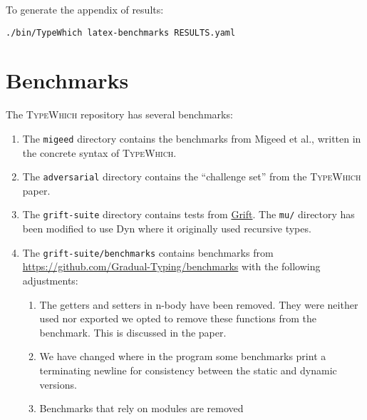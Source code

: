 \documentclass{article}
\newcommand{\system}{\textsc{TypeWhich}\xspace}
\begin{document}
To generate the appendix of results:

\begin{verbatim}
./bin/TypeWhich latex-benchmarks RESULTS.yaml 
\end{verbatim}

\section{Benchmarks}

The \system repository has several benchmarks:

\begin{enumerate}
   
\item The \texttt{migeed} directory contains the benchmarks
from Migeed et al., written in the concrete syntax of \system.

\item The \texttt{adversarial} directory contains the ``challenge set'' from
the \system paper.

\item The \texttt{grift-suite} directory contains tests from
\href{https://github.com/Gradual-Typing/Grift/tree/master/tests/suite}{Grift}.
The
\texttt{mu/} directory has been modified to use Dyn where it originally used recursive
types.

\item The \texttt{grift-suite/benchmarks} contains benchmarks from
\url{https://github.com/Gradual-Typing/benchmarks} with the following
adjustments:

\begin{enumerate}
\item The getters and setters in n-body have been removed. They were neither used
nor exported we opted to remove these functions from the benchmark. This is
discussed in the paper.
\item We have changed where in the program some benchmarks print a terminating
newline for consistency between the static and dynamic versions.
\item Benchmarks that rely on modules are removed
\end{enumerate}
\end{enumerate}


\end{document}
